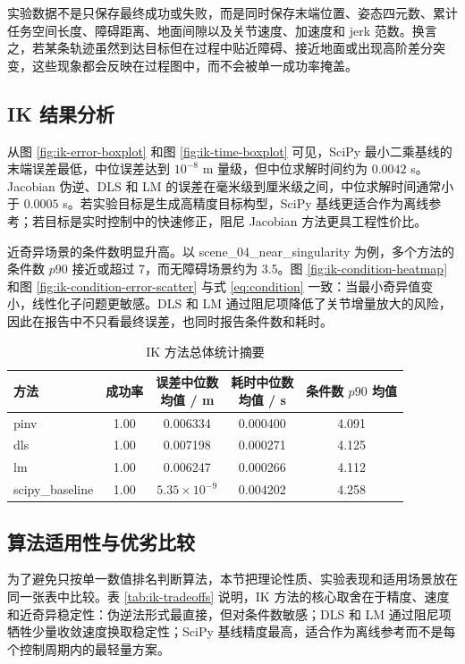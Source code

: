 \documentclass[UTF8,zihao=-4]{ctexart}
\begin{document}
实验数据不是只保存最终成功或失败，而是同时保存末端位置、姿态四元数、累计任务空间长度、障碍距离、地面间隙以及关节速度、加速度和 jerk 范数。换言之，若某条轨迹虽然到达目标但在过程中贴近障碍、接近地面或出现高阶差分突变，这些现象都会反映在过程图中，而不会被单一成功率掩盖。

\subsection{IK 结果分析}
从图 \ref{fig:ik-error-boxplot} 和图 \ref{fig:ik-time-boxplot} 可见，SciPy 最小二乘基线的末端误差最低，中位误差达到 $10^{-8}$ m 量级，但中位求解时间约为 $0.0042$ s。Jacobian 伪逆、DLS 和 LM 的误差在毫米级到厘米级之间，中位求解时间通常小于 $0.0005$ s。若实验目标是生成高精度目标构型，SciPy 基线更适合作为离线参考；若目标是实时控制中的快速修正，阻尼 Jacobian 方法更具工程性价比。

近奇异场景的条件数明显升高。以 scene\_04\_near\_singularity 为例，多个方法的条件数 $p90$ 接近或超过 7，而无障碍场景约为 3.5。图 \ref{fig:ik-condition-heatmap} 和图 \ref{fig:ik-condition-error-scatter} 与式 \eqref{eq:condition} 一致：当最小奇异值变小，线性化子问题更敏感。DLS 和 LM 通过阻尼项降低了关节增量放大的风险，因此在报告中不只看最终误差，也同时报告条件数和耗时。

\begin{table}[!htbp]
  \centering
  \caption{IK 方法总体统计摘要}
  \label{tab:ik-summary-short}
  \small
  \begin{tabularx}{\textwidth}{lcccc}
    \toprule
    方法 & 成功率 & \makecell{误差中位数\\均值 / m} & \makecell{耗时中位数\\均值 / s} & \makecell{条件数\\$p90$ 均值} \\
    \midrule
    pinv & 1.00 & 0.006334 & 0.000400 & 4.091 \\
    dls & 1.00 & 0.007198 & 0.000271 & 4.125 \\
    lm & 1.00 & 0.006247 & 0.000266 & 4.112 \\
    scipy\_baseline & 1.00 & $5.35\times10^{-9}$ & 0.004202 & 4.258 \\
    \bottomrule
  \end{tabularx}
\end{table}

\subsection{算法适用性与优劣比较}
为了避免只按单一数值排名判断算法，本节把理论性质、实验表现和适用场景放在同一张表中比较。表 \ref{tab:ik-tradeoffs} 说明，IK 方法的核心取舍在于精度、速度和近奇异稳定性：伪逆法形式最直接，但对条件数敏感；DLS 和 LM 通过阻尼项牺牲少量收敛速度换取稳定性；SciPy 基线精度最高，适合作为离线参考而不是每个控制周期内的最轻量方案。
\end{document}
